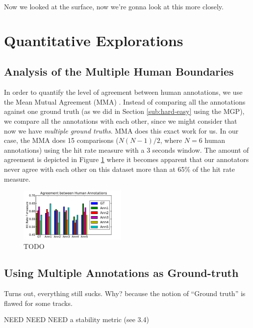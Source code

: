 \documentclass{article}
\begin{document}
Now we looked at the surface, now we're gonna look at this more closely.


\section{Quantitative Explorations}

\subsection{Analysis of the Multiple Human Boundaries}

In order to quantify the level of agreement between human annotations, we use the Mean Mutual Agreement (MMA) \cite{Holzapfel2012}.
Instead of comparing all the annotations against one ground truth (as we did in Section \ref{sub:hard-easy} using the MGP), we compare all the annotations with each other, since we might consider that now we have \textit{multiple ground truths}.
MMA does this exact work for us.
In our case, the MMA does 15 comparisons ($N(N-1)/2$, where $N=6$ human annotations) using the hit rate measure with a 3 seconds window.
The amount of agreement is depicted in Figure \ref{fig:human-agreement} where it becomes apparent that our annotators never agree with each other on this dataset more than at 65\% of the hit rate measure.

\begin{figure}
  \centering
  \includegraphics[width=0.47\textwidth]{plots/human-agreement.pdf}
  \caption{TODO}
  \label{fig:human-agreement}
\end{figure}%


\subsection{Using Multiple Annotations as Ground-truth}

Turns out, everything still sucks. Why? because the notion of “Ground truth” is flawed for some tracks.

NEED NEED NEED a stability metric (see 3.4)
\end{document}
